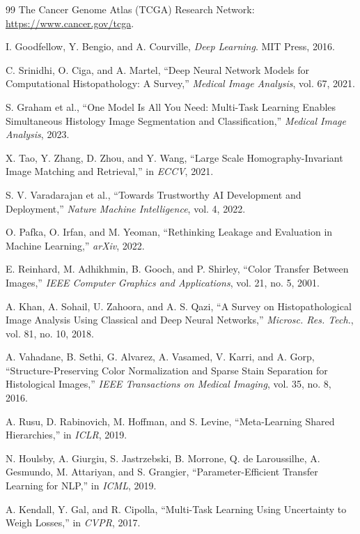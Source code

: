 \documentclass[conference,a4paper]{IEEEtran}
\begin{document}
\begin{thebibliography}{99}
The Cancer Genome Atlas (TCGA) Research Network: \url{https://www.cancer.gov/tcga}.

I. Goodfellow, Y. Bengio, and A. Courville, \emph{Deep Learning}. MIT Press, 2016.

C. Srinidhi, O. Ciga, and A. Martel, ``Deep Neural Network Models for Computational Histopathology: A Survey,'' \emph{Medical Image Analysis}, vol. 67, 2021.

S. Graham et al., ``One Model Is All You Need: Multi-Task Learning Enables Simultaneous Histology Image Segmentation and Classification,'' \emph{Medical Image Analysis}, 2023.

X. Tao, Y. Zhang, D. Zhou, and Y. Wang, ``Large Scale Homography-Invariant Image Matching and Retrieval,'' in \emph{ECCV}, 2021.

S. V. Varadarajan et al., ``Towards Trustworthy AI Development and Deployment,'' \emph{Nature Machine Intelligence}, vol. 4, 2022.

O. Pafka, O. Irfan, and M. Yeoman, ``Rethinking Leakage and Evaluation in Machine Learning,'' \emph{arXiv}, 2022.

E. Reinhard, M. Adhikhmin, B. Gooch, and P. Shirley, ``Color Transfer Between Images,'' \emph{IEEE Computer Graphics and Applications}, vol. 21, no. 5, 2001.

A. Khan, A. Sohail, U. Zahoora, and A. S. Qazi, ``A Survey on Histopathological Image Analysis Using Classical and Deep Neural Networks,'' \emph{Microsc. Res. Tech.}, vol. 81, no. 10, 2018.

A. Vahadane, B. Sethi, G. Alvarez, A. Vasamed, V. Karri, and A. Gorp, ``Structure-Preserving Color Normalization and Sparse Stain Separation for Histological Images,'' \emph{IEEE Transactions on Medical Imaging}, vol. 35, no. 8, 2016.

A. Rusu, D. Rabinovich, M. Hoffman, and S. Levine, ``Meta-Learning Shared Hierarchies,'' in \emph{ICLR}, 2019.

N. Houlsby, A. Giurgiu, S. Jastrzebski, B. Morrone, Q. de Laroussilhe, A. Gesmundo, M. Attariyan, and S. Grangier, ``Parameter-Efficient Transfer Learning for NLP,'' in \emph{ICML}, 2019.

A. Kendall, Y. Gal, and R. Cipolla, ``Multi-Task Learning Using Uncertainty to Weigh Losses,'' in \emph{CVPR}, 2017.


\end{thebibliography}
\end{document}
